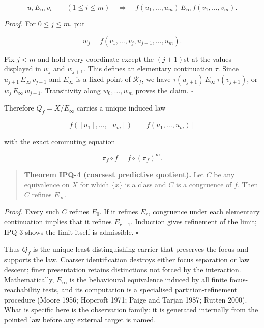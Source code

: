 \documentclass[11pt,a4paper]{article}
\begin{document}
\[u_{i}\, E_{\infty}\, v_{i}\quad\quad(1 \leq i \leq m)\quad \Rightarrow \quad f\left( u_{1},\ldots,u_{m} \right)\, E_{\infty}\, f\left( v_{1},\ldots,v_{m} \right).\]

\emph{Proof.} For \(0 \leq j \leq m\), put

\[w_{j} = f\left( v_{1},\ldots,v_{j},u_{j + 1},\ldots,u_{m} \right).\]

Fix \(j < m\) and hold every coordinate except the \((j + 1)\)st at the
values displayed in \(w_{j}\) and \(w_{j + 1}\). This defines an
elementary continuation \(\tau\). Since
\(u_{j + 1}\, E_{\infty}\, v_{j + 1}\) and \(E_{\infty}\) is a fixed
point of \(\mathcal{R}_{f}\), we have
\(\tau\left( u_{j + 1} \right)\, E_{\infty}\,\tau\left( v_{j + 1} \right)\),
or \(w_{j}\, E_{\infty}\, w_{j + 1}\). Transitivity along
\(w_{0},\ldots,w_{m}\) proves the claim. \(\ensuremath{\square}\)

Therefore \(Q_{f} = X/E_{\infty}\) carries a unique induced law

\[\bar{f}\left( \left\lbrack u_{1} \right\rbrack,\ldots,\left\lbrack u_{m} \right\rbrack \right) = \left\lbrack f\left( u_{1},\ldots,u_{m} \right) \right\rbrack\]

with the exact commuting equation

\[\pi_{f} \circ f = \bar{f} \circ \left( \pi_{f} \right)^{m}.\]

\begin{quote}
\textbf{Theorem IPQ-4 (coarsest predictive quotient).} Let \(C\) be any
equivalence on \(X\) for which \(\{ x\}\) is a class and \(C\) is a
congruence of \(f\). Then \(C\) refines \(E_{\infty}\).
\end{quote}

\emph{Proof.} Every such \(C\) refines \(E_{0}\). If it refines
\(E_{r}\), congruence under each elementary continuation implies that it
refines \(E_{r + 1}\). Induction gives refinement of the limit; IPQ-3
shows the limit itself is admissible. \(\ensuremath{\square}\)

Thus \(Q_{f}\) is the unique least-distinguishing carrier that preserves
the focus and supports the law. Coarser identification destroys either
focus separation or law descent; finer presentation retains distinctions
not forced by the interaction. Mathematically, \(E_{\infty}\) is the
behavioural equivalence induced by all finite focus-reachability tests,
and its computation is a specialised partition-refinement procedure
(Moore 1956; Hopcroft 1971; Paige and Tarjan 1987; Rutten 2000). What is
specific here is the observation family: it is generated internally from
the pointed law before any external target is named.
\end{document}
